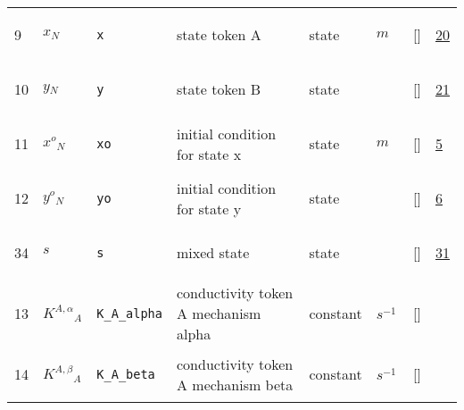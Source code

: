 \begin{longtable}{|p{1cm}|p{3cm}|p{3cm}|p{7cm}|p{3.0cm}|p{3cm}|p{2cm}|p{1cm}|}
    9
             & \hypertarget{"v:9"}{ $ {x}{_{N}} $}
             & \verb|x|
             & state token A
             & \begin{lay}state \end{lay}
             & $ m  $
             & []
             & \hyperlink{"e:20"}{ 20 }
                 \\
    10
             & \hypertarget{"v:10"}{ $ {y}{_{N}} $}
             & \verb|y|
             & state token B
             & \begin{lay}state \end{lay}
             & $  $
             & []
             & \hyperlink{"e:21"}{ 21 }
                 \\
    11
             & \hypertarget{"v:11"}{ $ {{x^o}}{_{N}} $}
             & \verb|xo|
             & initial condition for state x
             & \begin{lay}state \end{lay}
             & $ m  $
             & []
             & \hyperlink{"e:5"}{ 5 }
                 \\
    12
             & \hypertarget{"v:12"}{ $ {{y^o}}{_{N}} $}
             & \verb|yo|
             & initial condition for state y
             & \begin{lay}state \end{lay}
             & $  $
             & []
             & \hyperlink{"e:6"}{ 6 }
                 \\
    34
             & \hypertarget{"v:34"}{ $ {s}{_{}} $}
             & \verb|s|
             & mixed state
             & \begin{lay}state \end{lay}
             & $  $
             & []
             & \hyperlink{"e:31"}{ 31 }
                 \\
    13
             & \hypertarget{"v:13"}{ $ {{K^{A,\alpha}}}{_{A}} $}
             & \verb|K_A_alpha|
             & conductivity token A mechanism alpha 
             & \begin{lay}constant \end{lay}
             & $ s^{-1} \, $
             & []
             & \\
    14
             & \hypertarget{"v:14"}{ $ {{K^{A,\beta}}}{_{A}} $}
             & \verb|K_A_beta|
             & conductivity token A mechanism beta
             & \begin{lay}constant \end{lay}
             & $ s^{-1} \, $
             & []

\end{longtable}

